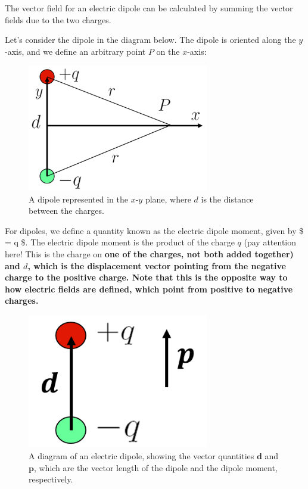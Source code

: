 \documentclass[
  letterpaper,
  DIV=11,
  numbers=noendperiod]{scrreprt}
\begin{document}
The vector field for an electric dipole can be calculated by summing the
vector fields due to the two charges.

Let's consider the dipole in the diagram below. The dipole is oriented
along the \(y\)-axis, and we define an arbitrary point \(P\) on the
\(x\)-axis:

\begin{figure}[H]

{\centering \includegraphics[width=3.125in,height=\textheight]{Figures/dipole_diagram.png}

}

\caption{A dipole represented in the \(x\)-\(y\) plane, where \(d\) is
the distance between the charges.}

\end{figure}%

For dipoles, we define a quantity known as the electric dipole moment,
given by \$ = q  \$. The electric
dipole moment is the product of the charge \(q\) (pay attention here!
This is the charge on
\bf{one of} the charges, not both added together) and $d$, which is the displacement vector pointing from the negative charge to the positive charge. Note that this is the opposite way to how electric fields are defined, which point from positive to negative charges.  

\begin{figure}[H]

{\centering \includegraphics[width=3.125in,height=\textheight]{Figures/dipole_moment.png}

}

\caption{A diagram of an electric dipole, showing the vector quantities
\(\mathrm{\mathbf{d}}\) and \(\mathrm{\mathbf{p}}\), which are the
vector length of the dipole and the dipole moment, respectively.}

\end{figure}%
\end{document}
